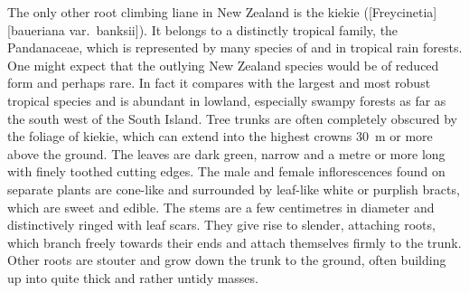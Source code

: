 The only other root climbing liane in New Zealand is the kiekie ([Freycinetia][baueriana var.\ banksii]).
It belongs to a distinctly tropical family, the Pandanaceae, which is represented by many species of  and  in tropical rain forests.
One might expect that the outlying New Zealand species would be of reduced form and perhaps rare.
In fact it compares with the largest and most robust tropical species and is abundant in lowland, especially swampy forests as far as the south west of the South Island.
Tree trunks are often completely obscured by the foliage of kiekie, which can extend into the highest crowns \SI{30}{\metre} or more above the ground.
The leaves are dark green, narrow and a metre or more long with finely toothed cutting edges.
The male and female inflorescences found on separate plants are cone-like and surrounded by leaf-like white or purplish bracts, which are sweet and edible.
The stems are a few centimetres in diameter and distinctively ringed with leaf scars.
They give rise to slender, attaching roots, which branch freely towards their ends and attach themselves firmly to the trunk.
Other roots are stouter and grow down the trunk to the ground, often building up into quite thick and rather untidy masses.

